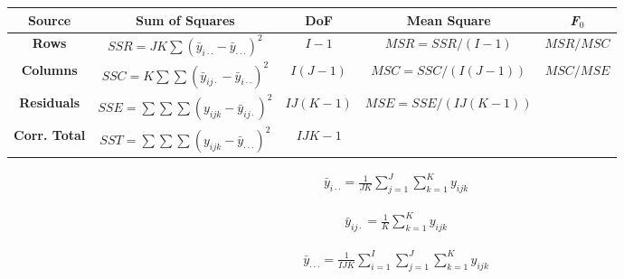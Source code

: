 \documentclass[12pt]{article}
\begin{document}
\pagestyle{empty}
\large
{}
\pagecolor{ehandbook}


\hspace{-1.75in}
\renewcommand*\arraystretch{1.5}
\begin{table}
\begin{tabular}{|c|c|c|c|c|} \hline 
{\bf Source}  & {\bf Sum of Squares} & {\bf DoF} & {\bf Mean Square} & {\bf \it{F}$_0$} \\ \hline
{\bf Rows}    & $SSR = JK\sum{{(\bar{y}_{i \cdot\cdot}-\bar{y}_{\cdot\cdot\cdot})}^2}$ & $I-1$ & $MSR = SSR/(I-1)$ & $MSR/MSC$ \\ \hline
{\bf Columns} & $SSC = K\sum \sum{{(\bar{y}_{ij\cdot} - \bar{y}_{i\cdot\cdot})}}^2$ & $I(J-1)$ & $MSC = SSC/(I(J-1))$  & $MSC/MSE$\\ \hline
{\bf Residuals} & $SSE = \sum \sum \sum{{(y_{ijk} - \bar{y}_{ij\cdot})^2}}$  & $IJ(K-1)$ & $MSE = SSE/(IJ(K-1))$  & \\ \hline
{\bf Corr. Total} & $SST = \sum \sum \sum{{(y_{ijk} - \bar{y}_{\cdot\cdot\cdot})^2}} $ & $IJK-1$ &  &\\ \hline
\end{tabular}
\end{table}

\vspace*{.5in} 

\begin{eqnarray*}
\bar{y}_{i \cdot \cdot} = \frac{1}{JK} \sum_{j=1}^{J}{\sum_{k=1}^{K}{{y_{ijk}}}}
\end{eqnarray*}

\begin{eqnarray*}
\bar{y}_{ij \cdot} =  \frac{1}{K} \sum_{k=1}^{K}{y_{ijk}}
\end{eqnarray*}

\begin{eqnarray*}
\bar{y}_{\cdot \cdot \cdot} = \frac{1}{IJK} \sum_{i=1}^{I}{\sum_{j=1}^{J}{\sum_{k=1}^{K}{{y_{ijk}}}}}
\end{eqnarray*}
\end{document}
